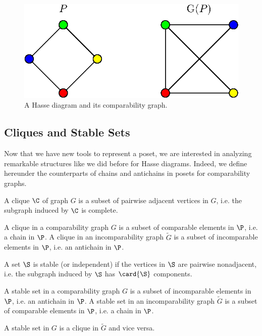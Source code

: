 \begin{figure}
\centering
\includegraphics[height=0.2\textheight]{fig/comp-graph}
\caption{\label{fig:comp-graph} A Hasse diagram and its comparability graph.}
\end{figure}




\subsection{Cliques and Stable Sets}


Now that we have new tools to represent a poset, we are interested in analyzing
remarkable structures like we did before for Hasse diagrams. Indeed, we define
hereunder the counterparts of chains and antichains in posets for
comparability graphs.

\begin{definition}[Clique]
A clique $\C$ of graph $G$ is a subset of pairwise adjacent vertices in $G$,
i.e. the subgraph induced by $\C$ is complete.
\end{definition}
A clique in a comparability graph ${G}$ is a subset of comparable elements in
$\P$, i.e. a chain in $\P$.
A clique in an incomparability graph $\widetilde{G}$ is a subset of
incomparable  elements in $\P$, i.e. an antichain in $\P$.

\begin{definition}
A set $\S$ is stable (or independent) if the vertices in $\S$ are pairwise
nonadjacent, i.e. the subgraph induced by $\S$ has $\card{\S}$ components.
\end{definition}
A stable set in a comparability graph ${G}$ is a subset of incomparable
elements in $\P$, i.e. an antichain in $\P$.
A stable set in an incomparability graph $\widetilde{G}$ is a subset of
comparable elements in $\P$, i.e. a chain in $\P$.


A stable set in ${G}$ is a clique in $\widetilde{G}$ and vice versa.



